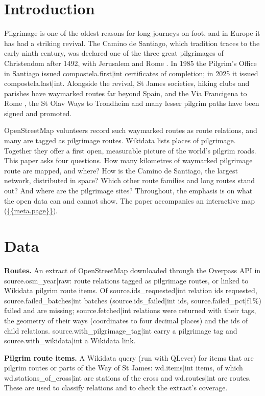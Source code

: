 \documentclass[11pt,a4paper]{article}
\begin{document}
\section{Introduction}
Pilgrimage is one of the oldest reasons for long journeys on foot, and in Europe it has had a striking revival. The Camino de Santiago, which tradition traces to the early ninth century, was declared one of the three great pilgrimages of Christendom after 1492, with Jerusalem and Rome \citep{wikicamino}. In 1985 the Pilgrim's Office in Santiago issued {{compostela.first|int}} certificates of completion; in 2025 it issued {{compostela.last|int}}. Alongside the revival, St James societies, hiking clubs and parishes have waymarked routes far beyond Spain, and the Via Francigena to Rome \citep{wikivf}, the St Olav Ways to Trondheim \citep{wikiolav} and many lesser pilgrim paths have been signed and promoted.

OpenStreetMap volunteers record such waymarked routes as route relations, and many are tagged as pilgrimage routes. Wikidata lists places of pilgrimage. Together they offer a first open, measurable picture of the world's pilgrim roads. This paper asks four questions. How many kilometres of waymarked pilgrimage route are mapped, and where? How is the Camino de Santiago, the largest network, distributed in space? Which other route families and long routes stand out? And where are the pilgrimage sites? Throughout, the emphasis is on what the open data can and cannot show. The paper accompanies an interactive map (\url{{{meta.page}}}).

\section{Data}
\textbf{Routes.} An extract of OpenStreetMap \citep{osm} downloaded through the Overpass API in {{source.osm_year|raw}}: route relations tagged as pilgrimage routes, or linked to Wikidata pilgrim route items. Of {{source.ids_requested|int}} relation ids requested, {{source.failed_batches|int}} batches ({{source.ids_failed|int}} ids, {{source.failed_pct|f1}}\%) failed and are missing; {{source.fetched|int}} relations were returned with their tags, the geometry of their ways (coordinates to four decimal places) and the ids of child relations. {{source.with_pilgrimage_tag|int}} carry a pilgrimage tag and {{source.with_wikidata|int}} a Wikidata link.

\textbf{Pilgrim route items.} A Wikidata \citep{wikidata} query (run with QLever) for items that are pilgrim routes or parts of the Way of St James: {{wd.items|int}} items, of which {{wd.stations_of_cross|int}} are stations of the cross and {{wd.routes|int}} are routes. These are used to classify relations and to check the extract's coverage.
\end{document}
